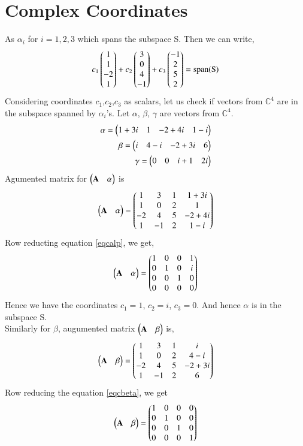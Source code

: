 \documentclass[journal,12pt,twocolumn]{IEEEtran}
\begin{document}
\section{Complex Coordinates}
As $\alpha_i$ for $i=1,2,3$ which spans the subspace S. Then we can write,
\begin{align}
c_1\begin{pmatrix}1\\1\\-2\\1\end{pmatrix}+c_2\begin{pmatrix}3\\0\\4\\-1\end{pmatrix}+c_3\begin{pmatrix}-1\\2\\5\\2\end{pmatrix}=\text{span(S)}
\end{align}
Considering coordinates $c_1$,$c_2$,$c_3$ as scalars, let us check if vectors from $\mathbb{C}^4$ are in the subspace spanned by $\alpha_i$'s.
Let $\alpha$, $\beta$, $\gamma$ are vectors from $\mathbb{C}^4$.
\begin{align}
\alpha=\begin{pmatrix}1+3i&1&-2+4i&1-i\end{pmatrix}\\
\beta=\begin{pmatrix}i&4-i&-2+3i&6\end{pmatrix}\\
\gamma=\begin{pmatrix}0&0&i+1&2i\end{pmatrix}
\end{align}
 Agumented matrix for $\begin{pmatrix}\mathbf{A}&\alpha\end{pmatrix}$ is
\begin{align}\label{eqcalp}
\begin{pmatrix}\mathbf{A}&\alpha\end{pmatrix}=\begin{pmatrix}1&3&1&1+3i\\1&0&2&1\\-2&4&5&-2+4i\\1&-1&2&1-i\end{pmatrix} 
\end{align}
Row reducting equation \eqref{eqcalp}, we get,
\begin{align}
\begin{pmatrix}\mathbf{A}&\alpha\end{pmatrix}=\begin{pmatrix}1&0&0&1\\0&1&0&i\\0&0&1&0\\0&0&0&0\end{pmatrix}
\end{align}
Hence we have the coordinates $c_1=1$, $c_2=i$, $c_3=0$. And hence $\alpha$ is in the subspace S.\\
 Similarly for $\beta$, augumented matrix $\begin{pmatrix}\mathbf{A}&\beta\end{pmatrix}$ is,
\begin{align}\label{eqcbeta}
\begin{pmatrix}\mathbf{A}&\beta\end{pmatrix}=\begin{pmatrix}1&3&1&i\\1&0&2&4-i\\-2&4&5&-2+3i\\1&-1&2&6\end{pmatrix} 
\end{align}
Row reducing the equation \eqref{eqcbeta}, we get
\begin{align}
\begin{pmatrix}\mathbf{A}&\beta\end{pmatrix}= \begin{pmatrix}1&0&0&0\\0&1&0&0\\0&0&1&0\\0&0&0&1\end{pmatrix}
\end{align}
\end{document}
